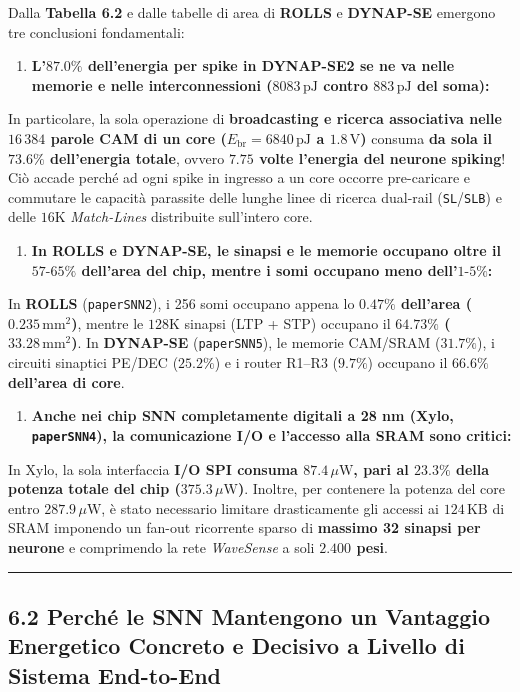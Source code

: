 \documentclass[11pt,a4paper]{article}
\begin{document}
Dalla \textbf{Tabella 6.2} e dalle tabelle di area di \textbf{ROLLS} e \textbf{DYNAP-SE} emergono tre conclusioni fondamentali:
\begin{enumerate}
  \item \textbf{L'$87.0\%$ dell'energia per spike in DYNAP-SE2 se ne va nelle memorie e nelle interconnessioni ($8083\,\text{pJ}$ contro $883\,\text{pJ}$ del soma):}
\end{enumerate}
In particolare, la sola operazione di \textbf{broadcasting e ricerca associativa nelle $16\,384$ parole CAM di un core ($E_{\text{br}} = 6840\,\text{pJ}$ a $1.8\,\text{V}$)} consuma \textbf{da sola il $73.6\%$ dell'energia totale}, ovvero \textbf{$7.75$ volte l'energia del neurone spiking}! Ciò accade perché ad ogni spike in ingresso a un core occorre pre-caricare e commutare le capacità parassite delle lunghe linee di ricerca dual-rail (\texttt{SL}/\texttt{SLB}) e delle $16\text{K}$ \textit{Match-Lines} distribuite sull'intero core.
\begin{enumerate}
  \item \textbf{In ROLLS e DYNAP-SE, le sinapsi e le memorie occupano oltre il $57\text{-}65\%$ dell'area del chip, mentre i somi occupano meno dell'$1\text{-}5\%$:}
\end{enumerate}
In \textbf{ROLLS} (\texttt{paperSNN2}), i 256 somi occupano appena lo \textbf{$0.47\%$ dell'area ($0.235\,\text{mm}^2$)}, mentre le $128\text{K}$ sinapsi (LTP + STP) occupano il \textbf{$64.73\%$ ($33.28\,\text{mm}^2$)}. In \textbf{DYNAP-SE} (\texttt{paperSNN5}), le memorie CAM/SRAM ($31.7\%$), i circuiti sinaptici PE/DEC ($25.2\%$) e i router R1--R3 ($9.7\%$) occupano il \textbf{$66.6\%$ dell'area di core}.
\begin{enumerate}
  \item \textbf{Anche nei chip SNN completamente digitali a 28 nm (Xylo, \texttt{paperSNN4}), la comunicazione I/O e l'accesso alla SRAM sono critici:}
\end{enumerate}
In Xylo, la sola interfaccia \textbf{I/O SPI consuma $87.4\,\mu\text{W}$, pari al $23.3\%$ della potenza totale del chip ($375.3\,\mu\text{W}$)}. Inoltre, per contenere la potenza del core entro $287.9\,\mu\text{W}$, è stato necessario limitare drasticamente gli accessi ai $124\,\text{KB}$ di SRAM imponendo un fan-out ricorrente sparso di \textbf{massimo 32 sinapsi per neurone} e comprimendo la rete \textit{WaveSense} a soli \textbf{$2.400$ pesi}.

\bigskip\hrule\bigskip

\subsection{6.2 Perché le SNN Mantengono un Vantaggio Energetico Concreto e Decisivo a Livello di Sistema End-to-End}
\end{document}
